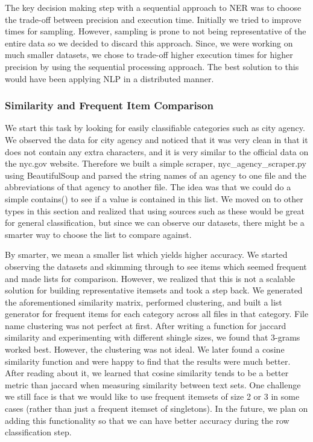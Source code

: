 \documentclass[sigconf,authordraft]{acmart}
\begin{document}
The key decision making step with a sequential approach to NER was to choose the trade-off between precision and execution time. Initially we tried to improve times for sampling. However, sampling is prone to not being representative of the entire data so we decided to discard this approach. Since, we were working on much smaller datasets, we chose to trade-off higher execution times for higher precision by using the sequential processing approach. The best solution to this would have been applying NLP in a distributed manner.

\subsubsection{Similarity and Frequent Item Comparison}
We start this task by looking for easily classifiable categories such as city agency. We observed the data for city agency and noticed that it was very clean in that it does not contain any extra characters, and it is very similar to the official data on the nyc.gov website. Therefore we built a simple scraper, nyc\_agency\_scraper.py using BeautifulSoup and parsed the string names of an agency to one file and the abbreviations of that agency to another file. The idea was that we could do a simple contains() to see if a value is contained in this list. We moved on to other types in this section and realized that using sources such as these would be great for general classification, but since we can observe our datasets, there might be a smarter way to choose the list to compare against. 
 
By smarter, we mean a smaller list which yields higher accuracy. We started observing the datasets and skimming through to see items which seemed frequent and made lists for comparison. However, we realized that this is not a scalable solution for building representative itemsets and took a step back. We generated the aforementioned similarity matrix, performed clustering, and built a list generator for frequent items for each category across all files in that category. File name clustering was not perfect at first. After writing a function for jaccard similarity and experimenting with different shingle sizes, we found that 3-grams worked best. However, the clustering was not ideal. We later found a cosine similarity function and were happy to find that the results were much better. After reading about it, we learned that cosine similarity tends to be a better metric than jaccard when measuring similarity between text sets. One challenge we still face is that we would like to use frequent itemsets of size 2 or 3 in some cases (rather than just a frequent itemset of singletons). In the future, we plan on adding this functionality so that we can have better accuracy during the row classification step.
\end{document}
